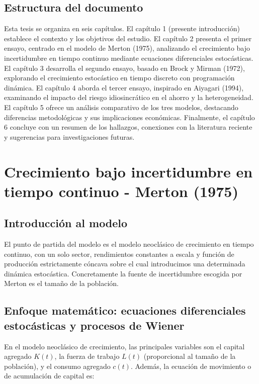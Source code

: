 \documentclass[a4paper,12pt]{article}
\begin{document}
	\subsection{Estructura del documento}
	Esta tesis se organiza en seis capítulos. El capítulo 1 (presente introducción) establece el contexto y los objetivos del estudio. El capítulo 2 presenta el primer ensayo, centrado en el modelo de Merton (1975), analizando el crecimiento bajo incertidumbre en tiempo continuo mediante ecuaciones diferenciales estocásticas. El capítulo 3 desarrolla el segundo ensayo, basado en Brock y Mirman (1972), explorando el crecimiento estocástico en tiempo discreto con programación dinámica. El capítulo 4 aborda el tercer ensayo, inspirado en Aiyagari (1994), examinando el impacto del riesgo idiosincrático en el ahorro y la heterogeneidad. El capítulo 5 ofrece un análisis comparativo de los tres modelos, destacando diferencias metodológicas y sus implicaciones económicas. Finalmente, el capítulo 6 concluye con un resumen de los hallazgos, conexiones con la literatura reciente y sugerencias para investigaciones futuras.

	\section{Crecimiento bajo incertidumbre en tiempo continuo - Merton (1975)}
	
	\subsection{Introducción al modelo}

	El punto de partida del modelo es el modelo neoclásico de crecimiento en tiempo continuo, con un solo sector, rendimientos constantes a escala y función de producción estrictamente cóncava sobre el cual introducimos una determinada dinámica estocástica. Concretamente la fuente de incertidumbre escogida por Merton es el tamaño de la población.
	
	\subsection{Enfoque matemático: ecuaciones diferenciales estocásticas y procesos de Wiener}
		
		En el modelo neoclásico de crecimiento, las principales variables son el capital agregado \( K(t) \), la fuerza de trabajo \( L(t) \) (proporcional al tamaño de la población), y el consumo agregado \( c(t) \). Además, la ecuación de movimiento o de acumulación de capital es:
		
\end{document}
